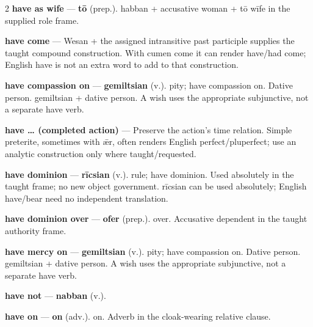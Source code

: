 \begin{multicols}{2}
\textbf{have as wife} — \textbf{tō} (prep.). habban + accusative woman + tō wīfe in the supplied role frame.\par
\textbf{have come} — Wesan + the assigned intransitive past participle supplies the taught compound construction. With cumen come it can render have/had come; English have is not an extra word to add to that construction.\par
\textbf{have compassion on} — \textbf{gemiltsian} (v.). pity; have compassion on. Dative person. gemiltsian + dative person. A wish uses the appropriate subjunctive, not a separate have verb.\par
\textbf{have … (completed action)} — Preserve the action's time relation. Simple preterite, sometimes with ǣr, often renders English perfect/pluperfect; use an analytic construction only where taught/requested.\par
\textbf{have dominion} — \textbf{rīcsian} (v.). rule; have dominion. Used absolutely in the taught frame; no new object government. rīcsian can be used absolutely; English have/bear need no independent translation.\par
\textbf{have dominion over} — \textbf{ofer} (prep.). over. Accusative dependent in the taught authority frame.\par
\textbf{have mercy on} — \textbf{gemiltsian} (v.). pity; have compassion on. Dative person. gemiltsian + dative person. A wish uses the appropriate subjunctive, not a separate have verb.\par
\textbf{have not} — \textbf{nabban} (v.).\par
\textbf{have on} — \textbf{on} (adv.). on. Adverb in the cloak-wearing relative clause.\par

\end{multicols}
